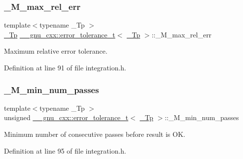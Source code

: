 \subsubsection{\texorpdfstring{\+\_\+\+M\+\_\+max\+\_\+rel\+\_\+err}{\_M\_max\_rel\_err}}
{\footnotesize\ttfamily template$<$typename \+\_\+\+Tp $>$ \\
\hyperlink{namespace____gnu__cxx_a3b19a9c800ca194374ef9172290f7d79}{\+\_\+\+Tp} \hyperlink{struct____gnu__cxx_1_1error__tolerance__t}{\+\_\+\+\_\+gnu\+\_\+cxx\+::error\+\_\+tolerance\+\_\+t}$<$ \hyperlink{namespace____gnu__cxx_a3b19a9c800ca194374ef9172290f7d79}{\+\_\+\+Tp} $>$\+::\+\_\+\+M\+\_\+max\+\_\+rel\+\_\+err}



Maximum relative error tolerance. 



Definition at line 91 of file integration.\+h.

\mbox{\label{struct____gnu__cxx_1_1error__tolerance__t_a395bb8004b293af143b531ec6de046f0}} 
\subsubsection{\texorpdfstring{\+\_\+\+M\+\_\+min\+\_\+num\+\_\+passes}{\_M\_min\_num\_passes}}
{\footnotesize\ttfamily template$<$typename \+\_\+\+Tp $>$ \\
unsigned \hyperlink{struct____gnu__cxx_1_1error__tolerance__t}{\+\_\+\+\_\+gnu\+\_\+cxx\+::error\+\_\+tolerance\+\_\+t}$<$ \hyperlink{namespace____gnu__cxx_a3b19a9c800ca194374ef9172290f7d79}{\+\_\+\+Tp} $>$\+::\+\_\+\+M\+\_\+min\+\_\+num\+\_\+passes}



Minimum number of consecutive passes before result is OK. 



Definition at line 95 of file integration.\+h.

\mbox{\label{struct____gnu__cxx_1_1error__tolerance__t_aa3f36e75dc6dd3c6d8283ffa18f78056}} 
